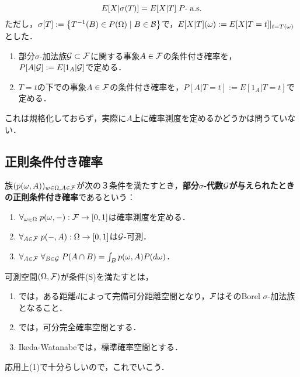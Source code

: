 \documentclass[uplatex,dvipdfmx]{jsreport}
\begin{document}
\begin{lemma}
    \[E[X|\sigma(T)]=E[X|T]\;P\text{-}\;\mathrm{a.s.}\]
    ただし，$\sigma[T]:=\left\{T^{-1}(B)\in P(\Omega)\mid B\in\mathcal{B}\right\}$で，$E[X|T](\omega):=E[X|T=t]|_{t=T(\omega)}$とした．
\end{lemma}

\begin{definition}[条件付き確率]\mbox{}
    \begin{enumerate}
        \item 部分$\sigma$-加法族$\mathcal{G}\subset\mathcal{F}$に関する事象$A\in\mathcal{F}$の条件付き確率を，$P[A|\mathcal{G}]:=E[1_A|\mathcal{G}]$で定める．
        \item $T=t$の下での事象$A\in\mathcal{F}$の条件付き確率を，$P[A|T=t]:=E[1_A|T=t]$で定める．
    \end{enumerate}
\end{definition}
\begin{remark}
    これは規格化しておらず，実際に$A$上に確率測度を定めるかどうかは問うていない．
\end{remark}

\subsection{正則条件付き確率}

\begin{definition}
    族$(p(\omega,A))_{w\in\Omega,A\in\mathcal{F}}$が次の３条件を満たすとき，\textbf{部分$\sigma$-代数$\mathcal{G}$が与えられたときの正則条件付き確率}であるという：
    \begin{enumerate}
        \item $\forall_{\omega\in\Omega}\;p(\omega,-):\mathcal{F}\to[0,1]$は確率測度を定める．
        \item $\forall_{A\in\mathcal{F}}\;p(-,A):\Omega\to[0,1]$は$\mathcal{G}$-可測．
        \item $\forall_{A\in \mathcal{F}}\;\forall_{B\in\mathcal{G}}\;P(A\cap B)=\int_Bp(\omega,A)P(d\omega)$．
    \end{enumerate}
\end{definition}

\begin{definition}
    可測空間$(\Omega,\mathcal{F})$が条件(S)を満たすとは，
    \begin{enumerate}
        \item \cite{吉田}では，ある距離$d$によって完備可分距離空間となり，$\mathcal{F}$はそのBorel $\sigma$-加法族となること．
        \item \cite{伊藤清}では，可分完全確率空間とする．
        \item Ikeda-Watanabeでは，標準確率空間とする．
    \end{enumerate}
    応用上(1)で十分らしいので，これでいこう．
\end{definition}
\end{document}
